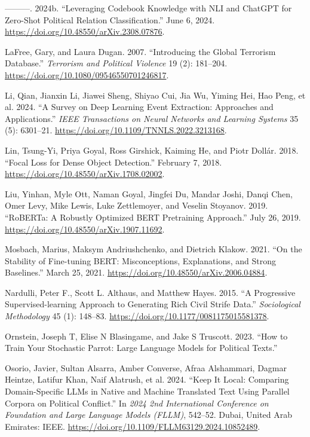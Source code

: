 \documentclass[
  11pt,
]{article}
\newlength{\cslhangindent}
\newenvironment{CSLReferences}[2] %
 {\begin{list}{}{%
  \setlength{\itemindent}{0pt}
  \setlength{\leftmargin}{0pt}
  \setlength{\parsep}{0pt}
  \ifodd #1
   \setlength{\leftmargin}{\cslhangindent}
   \setlength{\itemindent}{-1\cslhangindent}
  \fi
  \setlength{\itemsep}{#2\baselineskip}}}
 {\end{list}}
\begin{document}
\begin{CSLReferences}{1}{0}
---------. 2024b. {``Leveraging {Codebook Knowledge} with {NLI} and
{ChatGPT} for {Zero-Shot Political Relation Classification}.''} June 6,
2024. \url{https://doi.org/10.48550/arXiv.2308.07876}.

LaFree, Gary, and Laura Dugan. 2007. {``Introducing the {Global
Terrorism Database}.''} \emph{Terrorism and Political Violence} 19 (2):
181--204. \url{https://doi.org/10.1080/09546550701246817}.

Li, Qian, Jianxin Li, Jiawei Sheng, Shiyao Cui, Jia Wu, Yiming Hei, Hao
Peng, et al. 2024. {``A {Survey} on {Deep Learning Event Extraction}:
{Approaches} and {Applications}.''} \emph{IEEE Transactions on Neural
Networks and Learning Systems} 35 (5): 6301--21.
\url{https://doi.org/10.1109/TNNLS.2022.3213168}.

Lin, Tsung-Yi, Priya Goyal, Ross Girshick, Kaiming He, and Piotr Dollár.
2018. {``Focal {Loss} for {Dense Object Detection}.''} February 7, 2018.
\url{https://doi.org/10.48550/arXiv.1708.02002}.

Liu, Yinhan, Myle Ott, Naman Goyal, Jingfei Du, Mandar Joshi, Danqi
Chen, Omer Levy, Mike Lewis, Luke Zettlemoyer, and Veselin Stoyanov.
2019. {``{RoBERTa}: {A Robustly Optimized BERT Pretraining Approach}.''}
July 26, 2019. \url{https://doi.org/10.48550/arXiv.1907.11692}.

Mosbach, Marius, Maksym Andriushchenko, and Dietrich Klakow. 2021. {``On
the {Stability} of {Fine-tuning BERT}: {Misconceptions}, {Explanations},
and {Strong Baselines}.''} March 25, 2021.
\url{https://doi.org/10.48550/arXiv.2006.04884}.

Nardulli, Peter F., Scott L. Althaus, and Matthew Hayes. 2015. {``A
{Progressive Supervised-learning Approach} to {Generating Rich Civil
Strife Data}.''} \emph{Sociological Methodology} 45 (1): 148--83.
\url{https://doi.org/10.1177/0081175015581378}.

Ornstein, Joseph T, Elise N Blasingame, and Jake S Truscott. 2023.
{``How to {Train Your Stochastic Parrot}: {Large Language Models} for
{Political Texts}.''}

Osorio, Javier, Sultan Alsarra, Amber Converse, Afraa Alshammari, Dagmar
Heintze, Latifur Khan, Naif Alatrush, et al. 2024. {``Keep It {Local}:
{Comparing Domain-Specific LLMs} in {Native} and {Machine Translated
Text} Using {Parallel Corpora} on {Political Conflict}.''} In \emph{2024
2nd {International Conference} on {Foundation} and {Large Language
Models} ({FLLM})}, 542--52. Dubai, United Arab Emirates: IEEE.
\url{https://doi.org/10.1109/FLLM63129.2024.10852489}.


\end{CSLReferences}
\end{document}
